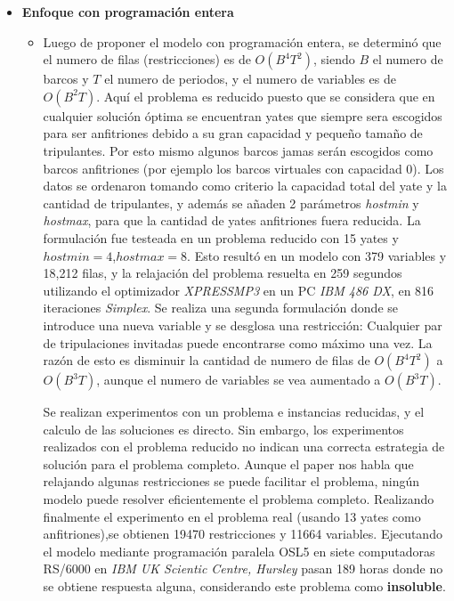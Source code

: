 \documentclass[letter, 10pt]{article}
\begin{document}
\begin{itemize}
\item \textbf{Enfoque con programación entera}
\begin{itemize}    
\item 
Luego de proponer el modelo con programación entera, se determinó que el numero de filas (restricciones) es de $O(B^4T^2)$, siendo $B$ el numero de barcos y $T$ el numero de periodos, y el numero de variables es de $O(B^2T)$. Aquí el problema es reducido puesto que se considera que en cualquier solución óptima se encuentran yates que siempre sera escogidos para ser anfitriones debido a su gran capacidad y pequeño tamaño de tripulantes. Por esto mismo algunos barcos jamas serán escogidos como barcos anfitriones (por ejemplo los barcos virtuales con capacidad 0). Los datos se ordenaron tomando como criterio la capacidad total del yate y la cantidad de tripulantes, y además se añaden 2 parámetros \textit{hostmin} y \textit{hostmax}, para que la cantidad de yates anfitriones fuera reducida. La formulación fue testeada en un problema reducido con 15 yates y $hostmin = 4$,$hostmax = 8$. Esto resultó en un
modelo con 379 variables y 18,212 filas, y la relajación del problema resuelta en 259 segundos utilizando el optimizador \textit{XPRESSMP3} en un PC \textit{IBM 486 DX}, en 816
iteraciones \textit{Simplex}.
Se realiza una segunda formulación donde  se introduce una nueva variable y se desglosa una restricción: Cualquier par de tripulaciones invitadas puede encontrarse como máximo una vez. La razón de esto es disminuir la cantidad de numero de filas de $O(B^4T^2)$ a $O(B^3T)$, aunque el numero de variables se vea aumentado a $O(B^3T)$. 

Se realizan experimentos con un problema e instancias reducidas, y el calculo de las soluciones es directo. Sin embargo, los experimentos realizados con el problema reducido no indican una correcta estrategia de solución para el problema completo. Aunque el paper nos habla que relajando algunas restricciones se puede facilitar el problema, ningún modelo puede resolver eficientemente el problema completo. Realizando finalmente el experimento en el problema real (usando 13 yates como anfitriones),se obtienen 19470 restricciones y 11664 variables. Ejecutando el modelo mediante programación paralela OSL5 en siete computadoras RS/6000 en \textit{IBM UK Scientic Centre, Hursley} pasan 189 horas donde no se obtiene respuesta alguna, considerando este problema como \textbf{insoluble}.
\end{itemize}


\end{itemize}
\end{document}
